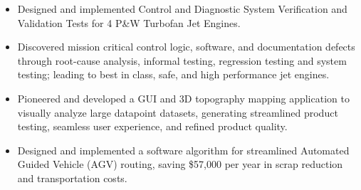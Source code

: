 \documentclass[11pt,a4paper,sans]{moderncv} %
\begin{document}

{
\begin{itemize}
	\item Designed and implemented Control and Diagnostic System Verification and Validation Tests for 4 P\&W Turbofan Jet Engines. 
	\item Discovered mission critical control logic, software, and documentation defects through root-cause analysis, informal testing, regression testing and system testing; leading to best in class, safe, and high performance jet engines.
\end{itemize}
}


{
\begin{itemize}
	\item Pioneered and developed a GUI and 3D topography mapping application to visually analyze large datapoint datasets, generating streamlined product testing, seamless user experience, and refined product quality.
\end{itemize}
}

{
\begin{itemize}
	\item Designed and implemented a software algorithm for streamlined Automated Guided Vehicle (AGV) routing, saving \$57,000 per year in scrap reduction and transportation costs.
\end{itemize}
}


\printbibheading [title={Publications}]
\printbibliography[
    title={Conference Papers},
    keyword={conferences},
    heading=subbibliography, 
    resetnumbers=false]
\printbibliography[
    title={Journal Articles},
    keyword={journals},
    heading=subbibliography, 
    resetnumbers=false]
\printbibliography[
    title={Workshop Papers},
    keyword={workshops}, 
    heading=subbibliography, 
    resetnumbers=false]
\end{document}
